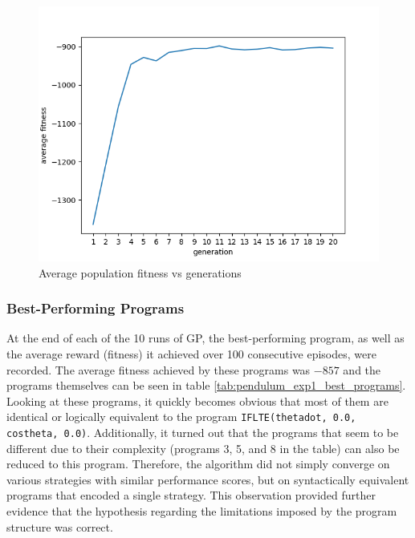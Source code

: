 \begin{figure}[ht]
    \centering
    \includegraphics[width=12cm]{images/pend_simple_gp_agent.png}
    \caption{Average population fitness vs generations}
    \label{fig:pendulum_exp1_plot}
\end{figure}

\subsubsection{Best-Performing Programs}
At the end of each of the 10 runs of GP, the best-performing program, as well as the average reward (fitness) it achieved over 100 consecutive episodes, were recorded. The average fitness achieved by these programs was $-857$ and the programs themselves can be seen in table \ref{tab:pendulum_exp1_best_programs}. Looking at these programs, it quickly becomes obvious that most of them are identical or logically equivalent to the program \verb+IFLTE(thetadot, 0.0, costheta, 0.0)+. Additionally, it turned out that the programs that seem to be different due to their complexity (programs 3, 5, and 8 in the table) can also be reduced to this program. Therefore, the algorithm did not simply converge on various strategies with similar performance scores, but on syntactically equivalent programs that encoded a single strategy. This observation provided further evidence that the hypothesis regarding the limitations imposed by the program structure was correct.

